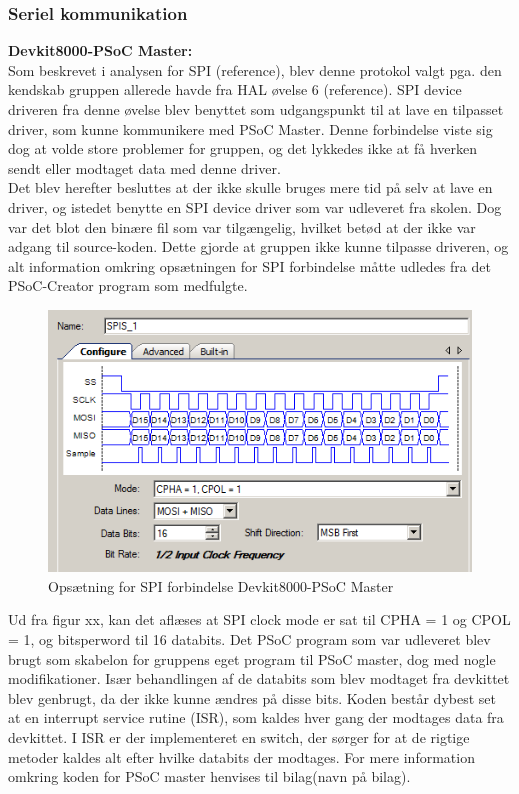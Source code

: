 \subsubsection{Seriel kommunikation}

\textbf{Devkit8000-PSoC Master:} \\

Som beskrevet i analysen for SPI (reference), blev denne protokol valgt pga. den kendskab gruppen allerede havde fra HAL øvelse 6 (reference). 
SPI device driveren fra denne øvelse blev benyttet som udgangspunkt til at lave en tilpasset driver, som kunne kommunikere med PSoC Master. 
Denne forbindelse viste sig dog at volde store problemer for gruppen, og det lykkedes ikke at få hverken sendt eller modtaget data med denne driver.\\

Det blev herefter besluttes at der ikke skulle bruges mere tid på selv at lave en driver, og istedet benytte en SPI device driver som var udleveret fra skolen.
Dog var det blot den binære fil som var tilgængelig, hvilket betød at der ikke var adgang til source-koden. Dette gjorde at gruppen ikke kunne tilpasse driveren,
og alt information omkring opsætningen for SPI forbindelse måtte udledes fra det PSoC-Creator program som medfulgte. 

\begin{figure}[H]
\includegraphics[scale=0.6]{tex/Design/SPI/Clock_mode_SPI}
\caption{Opsætning for SPI forbindelse Devkit8000-PSoC Master}
\end{figure}

Ud fra figur xx, kan det aflæses at SPI clock mode er sat til CPHA = 1 og CPOL = 1, og bitsperword til 16 databits. Det PSoC program som var udleveret blev brugt
som skabelon for gruppens eget program til PSoC master, dog med nogle modifikationer. Især behandlingen af de databits som blev modtaget fra devkittet blev 
genbrugt, da der ikke kunne ændres på disse bits. Koden består dybest set at en interrupt service rutine (ISR), som kaldes hver gang
der modtages data fra devkittet. I ISR er der implementeret en switch, der sørger for at de rigtige metoder kaldes alt efter hvilke databits der modtages.
For mere information omkring koden for PSoC master henvises til bilag(navn på bilag). \\

